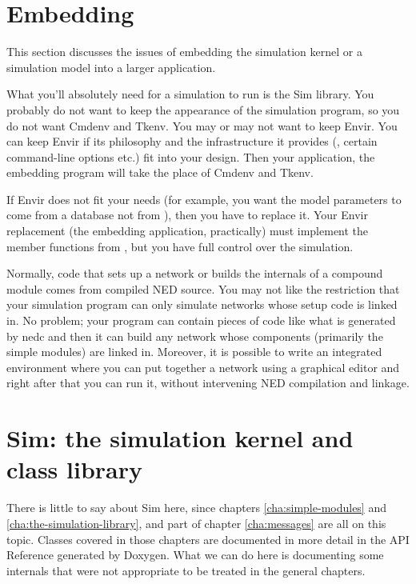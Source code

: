 \section{Embedding {\opp}}
\label{sec:ch-opp-design:embedding}

This section discusses the issues of embedding the simulation kernel
or a simulation model into a larger application.

What you'll absolutely need for a simulation to run is the Sim library. You
probably do not want to keep the appearance of the simulation program, so
you do not want Cmdenv and Tkenv. You may or may not want to keep Envir.
You can keep Envir if its philosophy and the infrastructure it provides
(, certain command-line options etc.) fit into your
design. Then your application, the embedding program will take the place of
Cmdenv and Tkenv.

If Envir does not fit your needs (for example, you want the model
parameters to come from a database not from ), then you
have to replace it. Your Envir replacement (the embedding application,
practically) must implement the  member functions from
, but you have full control over the simulation.

Normally, code that sets up a network or builds the internals of a
compound module comes from compiled NED source.  You may not like the
restriction that your simulation program can only simulate networks
whose setup code is linked in. No problem; your program can contain
pieces of code like what is generated by nedc and then it can build
any network whose components (primarily the simple modules) are linked
in. Moreover, it is possible to write an integrated environment where
you can put together a network using a graphical editor and right
after that you can run it, without intervening NED compilation and
linkage.





\section{Sim: the simulation kernel and class library}

There is little to say about Sim here, since chapters
\ref{cha:simple-modules} and \ref{cha:the-simulation-library},
and part of chapter \ref{cha:messages} are all on
this topic. Classes covered in those chapters are documented
in more detail in the API Reference generated by Doxygen.
What we can do here is documenting some internals
that were not appropriate to be treated in the general
chapters.


